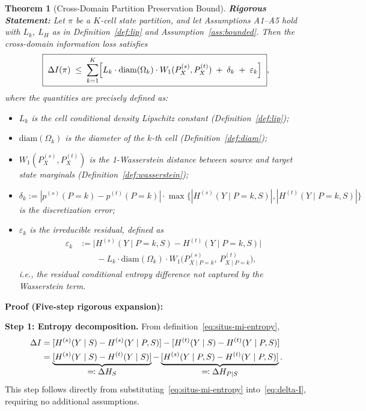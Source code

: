 \documentclass[12pt,a4paper]{article}
\newtheorem{theorem}{Theorem}[section]
\newcommand{\Wass}{W_1}
\newcommand{\diam}{\mathrm{diam}}
\begin{document}
\begin{theorem}[Cross-Domain Partition Preservation Bound]\label{thm:main-bound}
\textbf{Rigorous Statement:}
Let $\pi$ be a $K$-cell state partition, and let Assumptions A1--A5 hold with
$L_k$, $L_H$ as in Definition~\ref{def:lip} and Assumption~\ref{ass:bounded}.
Then the cross-domain information loss satisfies
\begin{equation}\label{eq:main-ineq}
    \boxed{\;
    \Delta I(\pi) \;\leq\;
    \sum_{k=1}^{K}
    \Bigl[
        L_k \cdot \diam(\Omega_k) \cdot \Wass(P^{(s)}_X, P^{(t)}_X)
        \;+\; \delta_k
        \;+\; \varepsilon_k
    \Bigr]
    \;},
\end{equation}
where the quantities are precisely defined as:
\begin{itemize}[nosep]
    \item $L_k$ is the cell conditional density Lipschitz constant (Definition~\ref{def:lip});
    \item $\diam(\Omega_k)$ is the diameter of the $k$-th cell (Definition~\ref{def:diam});
    \item $\Wass(P^{(s)}_X,P^{(t)}_X)$ is the 1-Wasserstein distance between source and target state marginals (Definition~\ref{def:wasserstein});
    \item $\delta_k := |p^{(s)}(P=k)-p^{(t)}(P=k)|\cdot
          \max\{|H^{(s)}(Y\mid P=k,S)|,|H^{(t)}(Y\mid P=k,S)|\}$
          is the discretization error;
    \item $\varepsilon_k$ is the irreducible residual, defined as
          \begin{align*}
          \varepsilon_k &:= \bigl|H^{(s)}(Y\mid P=k,S)
          -H^{(t)}(Y\mid P=k,S)\bigr| \\
          &\qquad - L_k\cdot\diam(\Omega_k)\cdot
          \Wass\!\bigl(P^{(s)}_{X\mid P=k},\,P^{(t)}_{X\mid P=k}\bigr),
          \end{align*}
          i.e., the residual conditional entropy difference not captured by the Wasserstein term.
\end{itemize}
\end{theorem}

\medskip\noindent
\textbf{Proof (Five-step rigorous expansion):}

\medskip\noindent
\textbf{Step 1: Entropy decomposition.}
From definition~\eqref{eq:situs-mi-entropy},
\begin{align}
    \Delta I &= [H^{(s)}(Y\mid S) - H^{(s)}(Y\mid P,S)]
               - [H^{(t)}(Y\mid S) - H^{(t)}(Y\mid P,S)] \notag\\
             &= \underbrace{[H^{(s)}(Y\mid S) - H^{(t)}(Y\mid S)]}_{\displaystyle
                \eqqcolon \Delta H_S}
                - \underbrace{[H^{(s)}(Y\mid P,S) -
                  H^{(t)}(Y\mid P,S)]}_{\displaystyle
                  \eqqcolon \Delta H_{P\mid S}}.
                \label{eq:decomp-step1}
\end{align}
This step follows directly from substituting~\eqref{eq:situs-mi-entropy} into~\eqref{eq:delta-I}, requiring no additional assumptions. \checkmark
\end{document}
